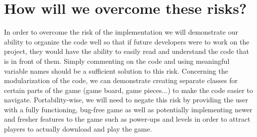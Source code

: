 \documentclass[12pt]{article}
\begin{document}
\section{How will we overcome these risks?}
In order to overcome the risk of the implementation we will demonstrate our ability to organize the code well so that if future developers were to work on the project, they would have the ability to easily read and understand the code that is in front of them.  Simply commenting on the code and using meaningful variable names should be a sufficient solution to this risk.  Concerning the modularization of the code, we can demonstrate creating separate classes for certain parts of the game (game board, game pieces...) to make the code easier to navigate.  Portability-wise, we will need to negate this risk by providing the user with a fully functioning, bug-free game as well as potentially implementing newer and fresher features to the game such as power-ups and levels in order to attract players to actually download and play the game.
\end{document}
